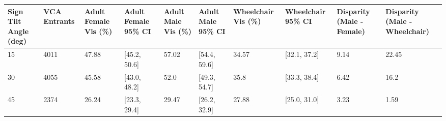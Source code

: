 \begin{tabular}{llllllllll}
\hline
Sign Tilt Angle (deg) & VCA Entrants & Adult Female Vis (\%) & Adult Female 95\% CI & Adult Male Vis (\%) & Adult Male 95\% CI & Wheelchair Vis (\%) & Wheelchair 95\% CI & Disparity (Male - Female) & Disparity (Male - Wheelchair) \\ \hline
15 & 4011 & 47.88 & [45.2, 50.6] & 57.02 & [54.4, 59.6] & 34.57 & [32.1, 37.2] & 9.14 & 22.45 \\
30 & 4055 & 45.58 & [43.0, 48.2] & 52.0 & [49.3, 54.7] & 35.8 & [33.3, 38.4] & 6.42 & 16.2 \\
45 & 2374 & 26.24 & [23.3, 29.4] & 29.47 & [26.2, 32.9] & 27.88 & [25.0, 31.0] & 3.23 & 1.59 \\
\hline
\end{tabular}
